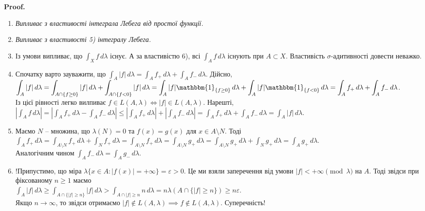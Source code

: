 \documentclass[a4paper, 10pt]{article}
\makeatletter
\theoremstyle{theoremdd}
\renewenvironment{proof}[1][Proof.\\]{\par
\pushQED{\hfill \qed}%
\normalfont \topsep6\p@\@plus6\p@\relax
\trivlist
\item\relax
{\bfseries
#1\@addpunct{.}}\hspace\labelsep\ignorespaces
}{%
\popQED\endtrivlist\@endpefalse
}
\makeatother
\begin{document}
\begin{proof}
\begin{enumerate}[wide=0pt,label={\arabic*)}]
\item \textit{Випливає з властивості інтеграла Лебега від простої функції.}

\item \textit{Випливає з властивості 5) інтегралу Лебега.}

\item Із умови випливає, що $\displaystyle\int_X f\,d\lambda$ існує. А за властивістю 6), всі $\displaystyle\int_A f\,d\lambda$ існують при $A \subset X$. Властивість $\sigma$-адитивності довести неважко.

\item Спочатку варто зауважити, що $\displaystyle\int_A |f|\,d\lambda = \int_A f_+\,d\lambda + \int_A f_-\,d\lambda$. Дійсно,\\
$\displaystyle\int_A |f|\,d\lambda = \int_{A \cap \{f \geq 0\}} |f|\,d\lambda + \int_{A \cap \{f < 0\}} |f|\,d\lambda = \int_A |f| \mathbbm{1}_{\{f \geq 0\}}\,d\lambda + \int_A |f|\mathbbm{1}_{\{f<0\}}\,d\lambda = \int_A f_+\,d\lambda + \int_A f_-\,d\lambda$.\\
Із цієї рівності легко вилпиває $f \in L(A,\lambda) \iff |f| \in L(A,\lambda)$. Нарешті,\\
$\displaystyle \left| \int_A f\,d\lambda\right| = \left| \int_A f_+\,d\lambda - \int_A f_-\,d\lambda \right|  \leq \left| \int_A f_+\,d\lambda \right| + \left| \int_A f_-\,d\lambda \right| = \int_A f_+\,d\lambda + \int_A f_-\,d\lambda = \int_A |f|\,d\lambda$.

\item Маємо $N$ -- множина, що $\lambda(N) = 0$ та $f(x) = g(x)$ для $x \in A \setminus N$. Тоді\\
$\displaystyle\int_A f_+\,d\lambda = \int_{A \setminus N}f_+\,d\lambda + \int_N f_+\,d\lambda = \int_{A \setminus N}f_+\,d\lambda = \int_{A \setminus N}g_+\,d\lambda = \int_{A \setminus N}g_+\,d\lambda + \int_N g_+\,d\lambda = \int_A g_+\,d\lambda$.\\
Аналогічним чином $\displaystyle\int_A f_-\,d\lambda = \int_A g_-\,d\lambda$.

\item !Припустимо, що міра $\lambda\{x \in A: |f(x)| = +\infty\} = \varepsilon > 0$. Це ми взяли заперечення від умови $|f| < +\infty \pmod \lambda$ на $A$. Тоді звідси при фіксованому $n \geq 1$ маємо\\
$\displaystyle\int_A |f|\,d\lambda \geq \int_{A \cap \{|f| \geq n\}} |f|\,d\lambda > \int_{A \cap |f| \geq n} n\,d\lambda = n \lambda(A \cap \{|f| \geq n\}) \geq n\varepsilon$.\\
Якщо $n \to \infty$, то звідси отримаємо $|f| \notin L(A,\lambda) \implies f \notin L(A,\lambda)$. Суперечність!


\end{enumerate}
\end{proof}
\end{document}
